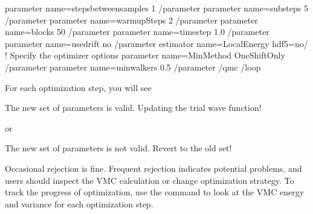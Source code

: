 \documentclass[letterpaper,10pt,english]{sphinxmanual}
\begin{document}
\begin{sphinxVerbatim}[commandchars=\\\{\}]
   \PYGZlt{}parameter name=\PYGZdq{}stepsbetweensamples\PYGZdq{}\PYGZgt{}    1 \PYGZlt{}/parameter\PYGZgt{}
   \PYGZlt{}parameter name=\PYGZdq{}substeps\PYGZdq{}\PYGZgt{}               5 \PYGZlt{}/parameter\PYGZgt{}
   \PYGZlt{}parameter name=\PYGZdq{}warmupSteps\PYGZdq{}\PYGZgt{}            2 \PYGZlt{}/parameter\PYGZgt{}
   \PYGZlt{}parameter name=\PYGZdq{}blocks\PYGZdq{}\PYGZgt{}                50 \PYGZlt{}/parameter\PYGZgt{}
   \PYGZlt{}parameter name=\PYGZdq{}timestep\PYGZdq{}\PYGZgt{}             1.0 \PYGZlt{}/parameter\PYGZgt{}
   \PYGZlt{}parameter name=\PYGZdq{}usedrift\PYGZdq{}\PYGZgt{}              no \PYGZlt{}/parameter\PYGZgt{}
   \PYGZlt{}estimator name=\PYGZdq{}LocalEnergy\PYGZdq{} hdf5=\PYGZdq{}no\PYGZdq{}/\PYGZgt{}
   \PYGZlt{}!\PYGZhy{}\PYGZhy{} Specify the optimizer options \PYGZhy{}\PYGZhy{}\PYGZgt{}
   \PYGZlt{}parameter name=\PYGZdq{}MinMethod\PYGZdq{}\PYGZgt{}    OneShiftOnly \PYGZlt{}/parameter\PYGZgt{}
   \PYGZlt{}parameter name=\PYGZdq{}minwalkers\PYGZdq{}\PYGZgt{}            0.5 \PYGZlt{}/parameter\PYGZgt{}
 \PYGZlt{}/qmc\PYGZgt{}
\PYGZlt{}/loop\PYGZgt{}
\end{sphinxVerbatim}

For each optimization step, you will see

\begin{sphinxVerbatim}[commandchars=\\\{\}]
The new set of parameters is valid. Updating the trial wave function!
\end{sphinxVerbatim}

or

\begin{sphinxVerbatim}[commandchars=\\\{\}]
The new set of parameters is not valid. Revert to the old set!
\end{sphinxVerbatim}

Occasional rejection is fine. Frequent rejection indicates potential
problems, and users should inspect the VMC calculation or change
optimization strategy. To track the progress of optimization, use the
command  to look at the VMC energy and
variance for each optimization step.
\end{document}
